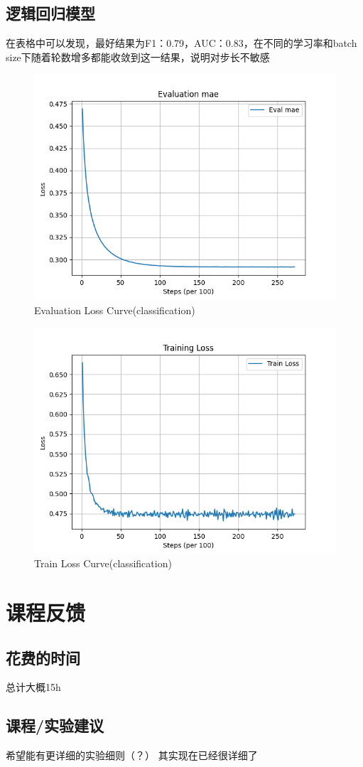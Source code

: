 \documentclass[12pt]{article}
\begin{document}
\subsection{逻辑回归模型}
在表格中可以发现，最好结果为F1：0.79，AUC：0.83，在不同的学习率和batch size下随着轮数增多都能收敛到这一结果，说明对步长不敏感
\begin{figure}[H]
    \centering
    \includegraphics[width=\textwidth]{eval_loss_curve_cl.png}  %
    \caption{Evaluation Loss Curve(classification)}
    \label{fig:eval_loss_curve_cl}
\end{figure}
\begin{figure}[H]
    \centering
    \includegraphics[width=\textwidth]{train_loss_curve_cl.png}  %
    \caption{Train Loss Curve(classification)}
    \label{fig:train_loss_curve_cl}
\end{figure}

\section{课程反馈}

\subsection{花费的时间}
总计大概15h

\subsection{课程/实验建议}
希望能有更详细的实验细则（？）
其实现在已经很详细了
\end{document}
